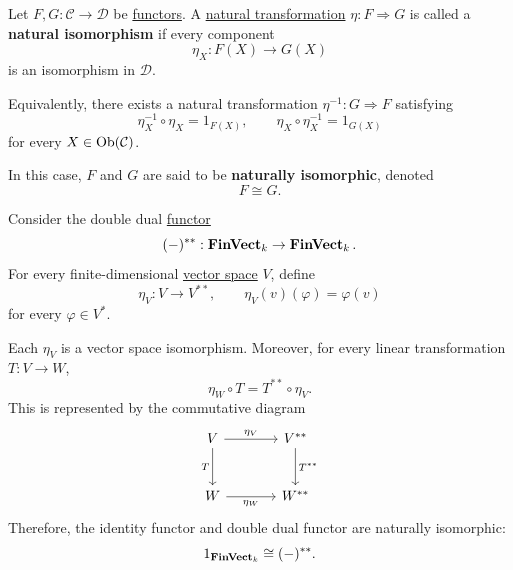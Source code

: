 	\begin{definition}
	  \label{def:natural-isomorphism}
		Let $F,G:\mathcal C\to\mathcal D$ be \hyperref[def:functor]{functors}.
		A \hyperref[def:natural-transformation]{natural transformation} $\eta:F\Rightarrow G$ is called
		a \textbf{natural isomorphism} if every component
		\begin{equation}
			\eta_X:F(X)\to G(X)
		\end{equation}
		is an isomorphism in $\mathcal D$.

		Equivalently, there exists a natural transformation
		$\eta^{-1}:G\Rightarrow F$ satisfying
		\begin{equation}
			\eta_X^{-1}\circ\eta_X=1_{F(X)},\qquad
			\eta_X\circ\eta_X^{-1}=1_{G(X)}
		\end{equation}
		for every $X\in\operatorname{Ob}(\mathcal C)$.

		In this case, $F$ and $G$ are said to be
		\textbf{naturally isomorphic}, denoted
		\begin{equation}
			F\cong G.
		\end{equation}
	\end{definition}

	\begin{example}
	  \label{ex:natural-isomorphism}
		Consider the double dual \hyperref[def:functor]{functor}
		\begin{equation}
			(-)^{**}:\operatorname{\mathbf{FinVect}}_k\to\operatorname{\mathbf{FinVect}}_k.
		\end{equation}
		For every finite-dimensional \hyperref[lin-def:vector-space]{vector space} $V$, define
		\begin{equation}
			\eta_V:V\to V^{**},\qquad
			\eta_V(v)(\varphi)=\varphi(v)
		\end{equation}
		for every $\varphi\in V^*$.

		Each $\eta_V$ is a vector space isomorphism. Moreover,
		for every linear transformation $T:V\to W$,
		\begin{equation}
			\eta_W\circ T=T^{**}\circ\eta_V.
		\end{equation}
		This is represented by the commutative diagram
		\begin{equation}
			\begin{tikzcd}[row sep=large, column sep=large]
				V \arrow[r, "\eta_V"] \arrow[d, "T"'] &
				V^{**} \arrow[d, "T^{**}"] \\
				W \arrow[r, "\eta_W"'] & W^{**}
			\end{tikzcd}
		\end{equation}
		Therefore, the identity functor and double dual functor
		are naturally isomorphic:
		\begin{equation}
			1_{\operatorname{\mathbf{FinVect}}_k}\cong(-)^{**}.
		\end{equation}
	\end{example}

